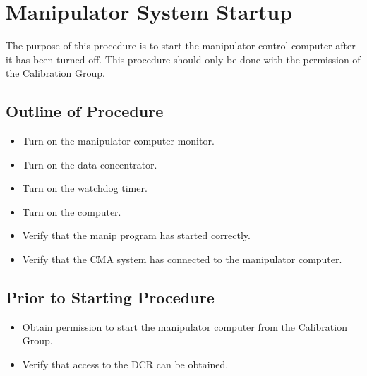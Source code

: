 \section{Manipulator System Startup}

The purpose of this procedure is to start the manipulator control computer after it has been turned off. This procedure should only be done with the permission of the Calibration Group.

\subsection{Outline of Procedure}
\begin{itemize}
\item Turn on the manipulator computer monitor.
\item Turn on the data concentrator.
\item Turn on the watchdog timer.
\item Turn on the computer.
\item Verify that the manip program has started correctly.
\item Verify that the CMA system has connected to the manipulator computer.
\end{itemize}

\subsection{Prior to Starting Procedure}
\begin{itemize}
\item Obtain permission to start the manipulator computer from the Calibration Group.
\item Verify that access to the DCR can be obtained.
\end{itemize}

